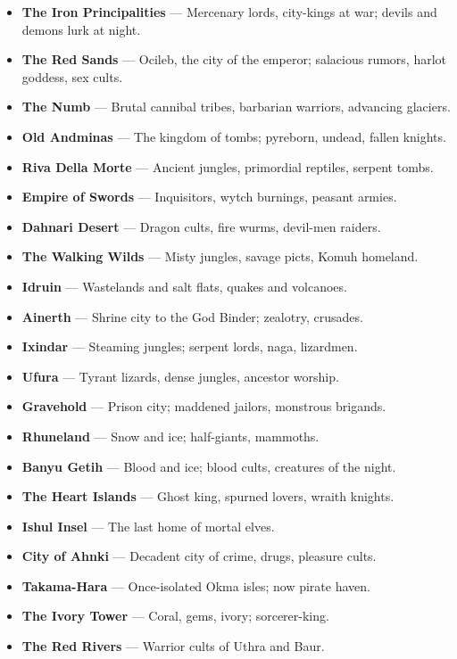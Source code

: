 \documentclass[10pt,twoside]{article}
\begin{document}
\begin{multicols}{2}
{\footnotesize
\begin{itemize}
\item \textbf{The Iron Principalities} — Mercenary lords, city-kings at war; devils and demons lurk at night.
\item \textbf{The Red Sands} — Ocileb, the city of the emperor; salacious rumors, harlot goddess, sex cults.
\item \textbf{The Numb} — Brutal cannibal tribes, barbarian warriors, advancing glaciers.
\item \textbf{Old Andminas} — The kingdom of tombs; pyreborn, undead, fallen knights.
\item \textbf{Riva Della Morte} — Ancient jungles, primordial reptiles, serpent tombs.
\item \textbf{Empire of Swords} — Inquisitors, wytch burnings, peasant armies.
\item \textbf{Dahnari Desert} — Dragon cults, fire wurms, devil-men raiders.
\item \textbf{The Walking Wilds} — Misty jungles, savage picts, Komuh homeland.
\item \textbf{Idruin} — Wastelands and salt flats, quakes and volcanoes.
\item \textbf{Ainerth} — Shrine city to the God Binder; zealotry, crusades.
\item \textbf{Ixindar} — Steaming jungles; serpent lords, naga, lizardmen.
\item \textbf{Ufura} — Tyrant lizards, dense jungles, ancestor worship.
\item \textbf{Gravehold} — Prison city; maddened jailors, monstrous brigands.
\item \textbf{Rhuneland} — Snow and ice; half-giants, mammoths.
\item \textbf{Banyu Getih} — Blood and ice; blood cults, creatures of the night.
\item \textbf{The Heart Islands} — Ghost king, spurned lovers, wraith knights.
\item \textbf{Ishul Insel} — The last home of mortal elves.
\item \textbf{City of Ahnki} — Decadent city of crime, drugs, pleasure cults.
\item \textbf{Takama-Hara} — Once-isolated Okma isles; now pirate haven.
\item \textbf{The Ivory Tower} — Coral, gems, ivory; sorcerer-king.
\item \textbf{The Red Rivers} — Warrior cults of Uthra and Baur.

\end{itemize}}
\end{multicols}
\end{document}
